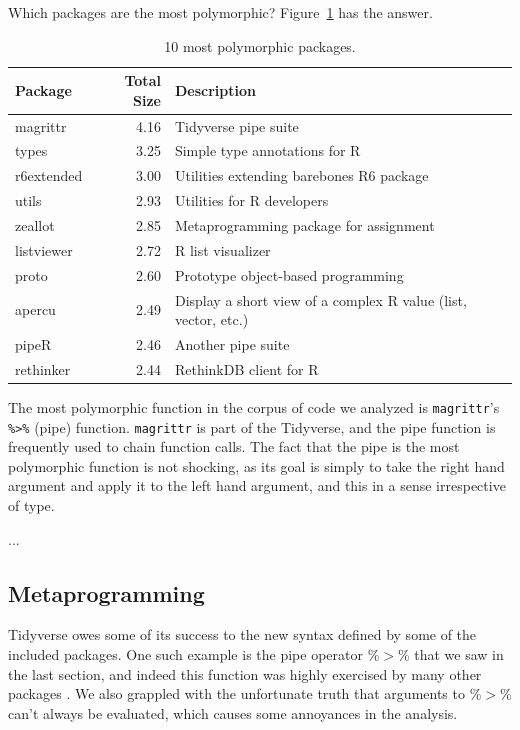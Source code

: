 \documentclass[acmsmall,10pt,review,anonymous]{acmart}\settopmatter{printfolios=true,printccs=false,printacmref=false}
\begin{document}
Which packages are the most polymorphic?
Figure~\ref{tab:packagepolysize} has the answer.

\begin{table}[ht]
\label{tab:packagepolysize}
\centering
\begin{tabular}{lrl}
  \hline
Package & Total Size & Description \\
  \hline
  magrittr & 4.16 & Tidyverse pipe suite \\
  types & 3.25 & Simple type annotations for R \\
  r6extended & 3.00 & Utilities extending barebones R6 package \\
  utils & 2.93 & Utilities for R developers \\
  zeallot & 2.85 & Metaprogramming package for assignment \\
  listviewer & 2.72 & R list visualizer \\
  proto & 2.60 & Prototype object-based programming \\
  apercu & 2.49 & Display a short view of a complex R value (list, vector, etc.) \\
  pipeR & 2.46 & Another pipe suite \\
  rethinker & 2.44 & RethinkDB client for R \\
   \hline
\end{tabular}
\caption{10 most polymorphic packages.}
\end{table}




The most polymorphic function in the corpus of code we analyzed is {\tt magrittr}'s {\tt \%>\%} (pipe) function.
{\tt magrittr} is part of the Tidyverse, and the pipe function is frequently used to chain function calls.
The fact that the pipe is the most polymorphic function is not shocking, as its goal is simply to take the right hand argument and apply it to the left hand argument, and this in a sense irrespective of type.

...

%
%
%
%
\subsection{Metaprogramming}


Tidyverse owes some of its success to the new syntax defined by some of the included packages.
One such example is the pipe operator \%$>$\% that we saw in the last section, and indeed this function was highly exercised by many other packages .
We also grappled with the unfortunate truth that arguments to \%$>$\% can't always be evaluated, which causes some annoyances in the analysis.
\end{document}
